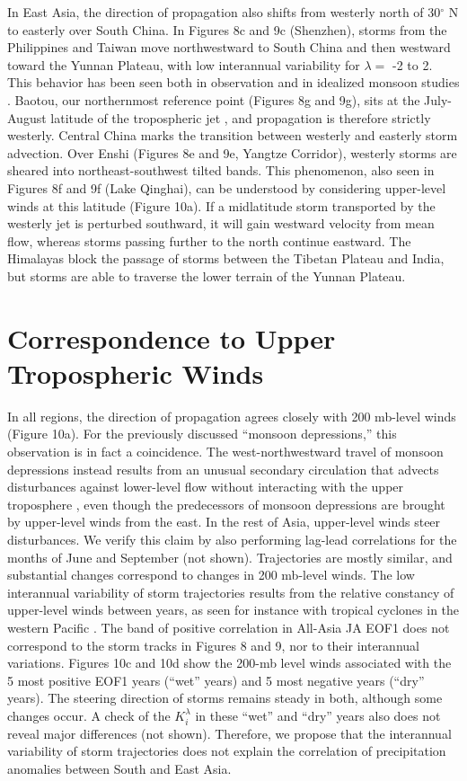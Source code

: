 	 In East Asia, the direction of propagation also shifts from westerly north of 30$^{\circ}$ N to easterly over South China. In Figures 8c and 9c (Shenzhen), storms from the Philippines and Taiwan move northwestward to South China and then westward toward the Yunnan Plateau, with low interannual variability for $\lambda =$ -2 to 2. This behavior has been seen both in observation \parencite{Chen1999,Liu2003} and in idealized monsoon studies \parencite{Prive2007a}. Baotou, our northernmost reference point (Figures 8g and 9g), sits at the July-August latitude of the tropospheric jet \parencite{Schiemann2009}, and propagation is therefore strictly westerly. Central China marks the transition between westerly and easterly storm advection. Over Enshi (Figures 8e and 9e, Yangtze Corridor), westerly storms are sheared into northeast-southwest tilted bands. This phenomenon, also seen in Figures 8f and 9f (Lake Qinghai), can be understood by considering upper-level winds at this latitude (Figure 10a). If a midlatitude storm transported by the westerly jet is perturbed southward, it will gain westward velocity from mean flow, whereas storms passing further to the north continue eastward. The Himalayas block the passage of storms between the Tibetan Plateau and India, but storms are able to traverse the lower terrain of the Yunnan Plateau.
	 
\section{Correspondence to Upper Tropospheric Winds}	 
	 
	 In all regions, the direction of propagation agrees closely with 200 mb-level winds (Figure 10a). For the previously discussed ``monsoon depressions,'' this observation is in fact a coincidence. The west-northwestward travel of monsoon depressions instead results from an unusual secondary circulation that advects disturbances against lower-level flow without interacting with the upper troposphere \parencite{Chen2000,Chen2005}, even though the predecessors of monsoon depressions are brought by upper-level winds from the east. In the rest of Asia, upper-level winds steer disturbances. We verify this claim by also performing lag-lead correlations for the months of June and September (not shown). Trajectories are mostly similar, and substantial changes correspond to changes in 200 mb-level winds. The low interannual variability of storm trajectories results from the relative constancy of upper-level winds between years, as seen for instance with tropical cyclones in the western Pacific \parencite{Kumar2005}. The band of positive correlation in All-Asia JA EOF1 does not correspond to the storm tracks in Figures 8 and 9, nor to their interannual variations. Figures 10c and 10d show the 200-mb level winds associated with the 5 most positive EOF1 years (``wet'' years) and 5 most negative years (``dry'' years). The steering direction of storms remains steady in both, although some changes occur. A check of the $K_i^\lambda$ in these ``wet'' and ``dry'' years also does not reveal major differences (not shown). Therefore, we propose that the interannual variability of storm trajectories does not explain the correlation of precipitation anomalies between South and East Asia.
	 
